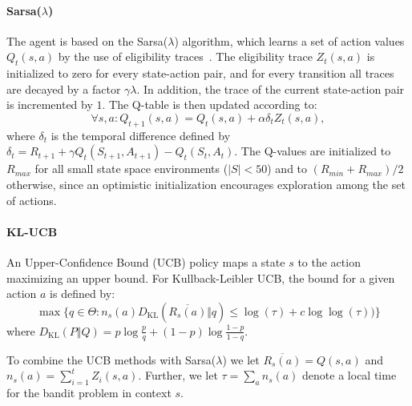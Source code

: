
\paragraph{Sarsa($\lambda$)}
The agent is based on the Sarsa($\lambda$) algorithm, which learns a set of
action values $Q_t(s,a)$ by the use of eligibility
traces~\cite{Sutton:1998:IRL:551283}. The eligibility trace $Z_t(s,a)$ is
initialized to zero for every state-action pair, and for every transition all
traces are decayed by a factor $\gamma\lambda$. In addition, the trace of the
current state-action pair is incremented by $1$. The Q-table is then updated
according to:
\begin{equation}
        \forall s,a : Q_{t+1}(s,a) = Q_t(s,a) + \alpha\delta_t Z_t(s,a),
\end{equation}
where $\delta_t$ is the temporal difference defined by $\delta_t = R_{t+1} +
\gamma Q_t(S_{t+1},A_{t+1}) - Q_t(S_t,A_t)$. The Q-values are initialized to
$R_{max}$ for all small state space environments ($\vert{S}\vert < 50$) and to
$(R_{min}+R_{max})/2$ otherwise, since an optimistic initialization encourages
exploration among the set of actions.

\paragraph{KL-UCB}
An Upper-Confidence Bound (UCB) policy maps a state $s$ to the action maximizing
an upper bound. For Kullback-Leibler UCB, the bound for a given action $a$ is
defined by:
\begin{equation}
    \max\big\{q \in \Theta : n_s(a)
        D_{\mathrm{KL}}\left(\overline{R_s(a)}\Big\Vert{q}\right) \le \log(\tau) +
        c\log\log(\tau))\big\}
\end{equation}
where $D_\mathrm{KL}(P\Vert{Q}) = p \log
\frac{p}{q}+(1-p)\log\frac{1-p}{1-q}$.~\cite{DBLP:journals/jmlr/GarivierC11}

To combine the UCB methods with Sarsa($\lambda$) we let
$\overline{R_s(a)}=Q(s,a)$ and $n_s(a) = \sum_{i=1}^tZ_i(s,a)$. Further, we let
$\tau = \sum_a{n_s(a)}$ denote a local time for the bandit problem in context
$s$.



